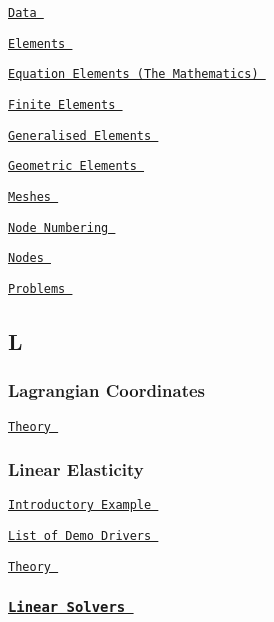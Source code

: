 \begin{DoxyItemize}
\item  \href{ ../../the_data_structure/html/index.html#data }{\tt Data }  
\item  \href{ ../../the_data_structure/html/index.html#elements }{\tt Elements }  
\begin{DoxyItemize}
\item  \href{ ../../the_data_structure/html/index.html#Maths_Element }{\tt Equation Elements (The Mathematics) }  
\item  \href{ ../../the_data_structure/html/index.html#Finite_Element }{\tt Finite Elements }  
\item  \href{ ../../the_data_structure/html/index.html#Generalised_Element }{\tt Generalised Elements }  
\item  \href{ ../../the_data_structure/html/index.html#Geometric_Element }{\tt Geometric Elements }  
\end{DoxyItemize}
\item  \href{ ../../the_data_structure/html/index.html#meshes }{\tt Meshes }  
\item  \href{ ../../the_data_structure/html/index.html#Node_DOF_numbering }{\tt Node Numbering }  
\item  \href{ ../../the_data_structure/html/index.html#nodes }{\tt Nodes }  
\item  \href{ ../../the_data_structure/html/index.html#problems }{\tt Problems }  
\end{DoxyItemize} \subsection*{ L }

 \subsubsection*{ Lagrangian Coordinates }

 
\begin{DoxyItemize}
\item  \href{ ../../solid/solid_theory/html/index.html#solids_lagrange }{\tt Theory }  
\end{DoxyItemize} \subsubsection*{ Linear Elasticity }

 
\begin{DoxyItemize}
\item  \href{ ../../linear_elasticity/periodic_load/html/index.html }{\tt Introductory Example }  
\item  \href{ ../../example_code_list/html/index.html#linear_elasticity }{\tt List of Demo Drivers }  
\item  \href{ ../../linear_elasticity/periodic_load/html/index.html }{\tt Theory }  
\end{DoxyItemize} \subsubsection*{ \href{ ../../linear_solvers/html/index.html }{\tt Linear Solvers } }


